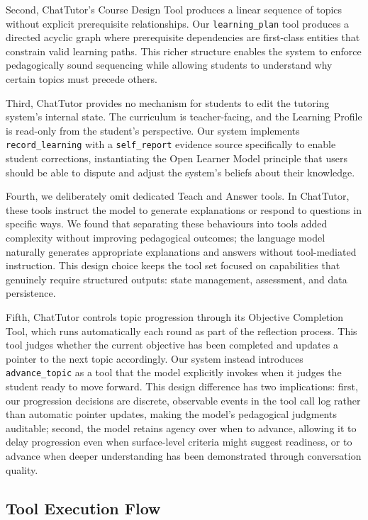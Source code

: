 \documentclass[logo,bsc,singlespacing,parskip,online]{infthesis}
\begin{document}
Second, ChatTutor's Course Design Tool produces a linear sequence of topics without explicit prerequisite relationships. Our \texttt{learning\_plan} tool produces a directed acyclic graph where prerequisite dependencies are first-class entities that constrain valid learning paths. This richer structure enables the system to enforce pedagogically sound sequencing while allowing students to understand why certain topics must precede others.

Third, ChatTutor provides no mechanism for students to edit the tutoring system's internal state. The curriculum is teacher-facing, and the Learning Profile is read-only from the student's perspective. Our system implements \texttt{record\_learning} with a \texttt{self\_report} evidence source specifically to enable student corrections, instantiating the Open Learner Model principle that users should be able to dispute and adjust the system's beliefs about their knowledge.

Fourth, we deliberately omit dedicated Teach and Answer tools. In ChatTutor, these tools instruct the model to generate explanations or respond to questions in specific ways. We found that separating these behaviours into tools added complexity without improving pedagogical outcomes; the language model naturally generates appropriate explanations and answers without tool-mediated instruction. This design choice keeps the tool set focused on capabilities that genuinely require structured outputs: state management, assessment, and data persistence.

Fifth, ChatTutor controls topic progression through its Objective Completion Tool, which runs automatically each round as part of the reflection process. This tool judges whether the current objective has been completed and updates a pointer to the next topic accordingly. Our system instead introduces \texttt{advance\_topic} as a tool that the model explicitly invokes when it judges the student ready to move forward. This design difference has two implications: first, our progression decisions are discrete, observable events in the tool call log rather than automatic pointer updates, making the model's pedagogical judgments auditable; second, the model retains agency over when to advance, allowing it to delay progression even when surface-level criteria might suggest readiness, or to advance when deeper understanding has been demonstrated through conversation quality.

\subsection{Tool Execution Flow}
\end{document}
